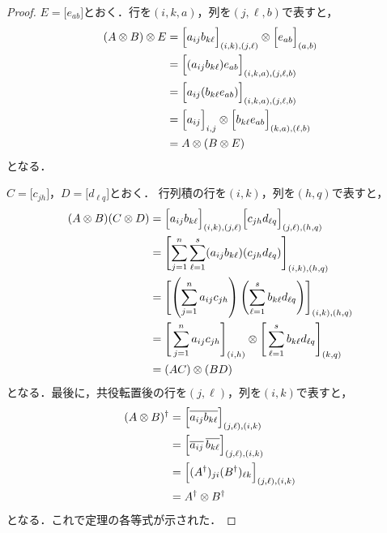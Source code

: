 \begin{proof}
  $E=\Big[e_{ab}\Big]$とおく．行を$(i,k,a)$，列を$(j,\ell,b)$で表すと，
  \begin{align*}
    (A\otimes B)\otimes E
     & =\Bigl[a_{ij}b_{k\ell}\Bigr]_{(i,k),(j,\ell)} \otimes \Big[e_{ab}\Big]_{(a,b)}  \\
     & =\Big[(a_{ij}b_{k\ell})e_{ab}\Big]_{(i,k,a),(j,\ell,b)}                         \\
     & =\Bigl[a_{ij}(b_{k\ell}e_{ab})\Bigr]_{(i,k,a),(j,\ell,b)}                       \\
     & = \Bigl[a_{ij}\Bigr]_{i,j} \otimes \Bigl[b_{k\ell}e_{ab}\Bigr]_{(k,a),(\ell,b)} \\
     & =A\otimes(B\otimes E)
  \end{align*}
  となる．

  $C=\Big[c_{jh}\Big]$，$D=\Big[d_{\ell q}\Big]$とおく．
  行列積の行を$(i,k)$，列を$(h,q)$で表すと，
  \begin{align*}
    (A\otimes B)(C\otimes D)
     & = \Bigl[a_{ij}b_{k\ell}\Bigr]_{(i,k),(j,\ell)} \Bigl[c_{jh}d_{\ell q}\Bigr]_{(j,\ell),(h,q)}                           \\
     & =\Biggl[\sum_{j=1}^{n}\sum_{\ell=1}^{s}(a_{ij}b_{k\ell})(c_{jh}d_{\ell q})
    \Biggr]_{(i,k),(h,q)}                                                                                                     \\
     & =\Biggl[\left(\sum_{j=1}^{n}a_{ij}c_{jh}\right)
      \left(\sum_{\ell=1}^{s}b_{k\ell}d_{\ell q}\right)
    \Biggr]_{(i,k),(h,q)}                                                                                                     \\
     & =\Bigg[ \sum_{j=1}^{n} a_{ij}c_{jh} \Bigg]_{(i,h)} \otimes \Bigg[ \sum_{\ell=1}^{s} b_{k\ell}d_{\ell q} \Bigg]_{(k,q)} \\
     & =(AC)\otimes(BD)
  \end{align*}
  となる．最後に，共役転置後の行を$(j,\ell)$，列を$(i,k)$で表すと，
  \begin{align*}
    (A\otimes B)^\dagger
     & =\Bigl[\overline{a_{ij}b_{k\ell}}\Bigr]_{(j,\ell),(i,k)}              \\
     & =\Bigl[\overline{a_{ij}}\,\overline{b_{k\ell}}\Bigr]_{(j,\ell),(i,k)} \\
     & =\Bigl[(A^\dagger)_{ji}(B^\dagger)_{\ell k}\Bigr]_{(j,\ell),(i,k)}    \\
     & =A^\dagger\otimes B^\dagger
  \end{align*}
  となる．これで定理の各等式が示された．
\end{proof}
